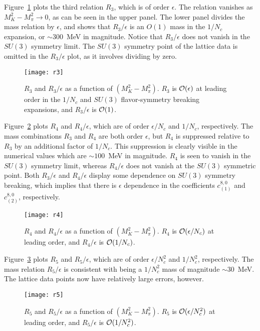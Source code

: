 \documentclass[twocolumn,nofootinbib,prd,aps,superscriptaddress,tightenlines]{revtex4}
\def\N{N_c}
\begin{document}
Figure~\ref{fig:r3} plots the third relation $R_3$, which is of order $\epsilon$. The relation vanishes as $M_K^2-M_\pi^2 \to 0$, as can be seen in the upper panel. The lower panel divides the mass relation by $\epsilon$, and shows that $R_3/\epsilon$ is an $O(1)$ mass in the $1/N_c$ expansion, or $\sim 300$~MeV in magnitude.  Notice that $R_3/\epsilon$ does not vanish in the $SU(3)$ symmetry limit.  The $SU(3)$ symmetry point of the lattice data is omitted in the $R_3/\epsilon$ plot, as it involves dividing by zero.
\begin{figure}
\texttt{[image: r3]}
\caption{$R_3$ and $R_3/\epsilon$ as a function of $(M_K^2 - M_\pi^2)$. $R_3$ is ${\cal O}(\epsilon)$ at leading order
in the $1/N_c$ and $SU(3)$ flavor-symmetry breaking expansions, and $R_3/\epsilon$ is ${\cal O}(1)$. \label{fig:r3}}
\end{figure}


Figure~\ref{fig:r4} plots $R_4$ and $R_4/\epsilon$, which are of order $\epsilon/\N$ and $1/\N$, respectively. The mass combinations $R_3$ and $R_4$ are both order $\epsilon$, but $R_4$ is suppressed relative to $R_3$ by an additional factor of $1/N_c$. This  suppression is clearly visible in the numerical values which are $\sim 100$~MeV in magnitude.  $R_4$ is seen to vanish in the $SU(3)$ symmetry limit, whereas $R_4/\epsilon$ does not vanish at the $SU(3)$ symmetric point. Both $R_3/\epsilon$ and $R_4/\epsilon$ display some dependence on $SU(3)$ symmetry breaking, which implies that there is $\epsilon$ dependence in the coefficients $c_{(1)}^{8,0}$ and $c_{(2)}^{8,0}$, respectively.
\begin{figure}
\texttt{[image: r4]}
\caption{$R_4$ and $R_4/\epsilon$ as a function of $(M_K^2 - M_\pi^2)$. $R_4$ is ${\cal O}(\epsilon/N_c)$ at leading order, and $R_4/\epsilon$ is ${\cal O}(1/N_c)$.\label{fig:r4}}
\end{figure}

Figure~\ref{fig:r5} plots $R_5$ and $R_5/\epsilon$, which are of order $\epsilon/\N^2$ and $1/\N^2$, respectively. The mass relation $R_5/\epsilon$ is consistent with being a $1/N_c^2$ mass of magnitude $\sim 30$~MeV.   The lattice data points now have relatively large errors, however.
\begin{figure}
\texttt{[image: r5]}
\caption{$R_5$ and $R_5/\epsilon$ as a function of $(M_K^2 - M_\pi^2)$.  $R_5$ is ${\cal O}(\epsilon/N_c^2)$ at leading order, and $R_5/\epsilon$ is ${\cal O}(1/N_c^2)$. \label{fig:r5}}
\end{figure}
\end{document}
